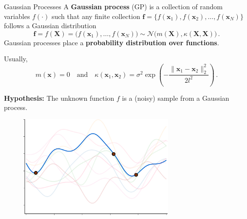 
    \begin{frame}{Gaussian Processes}
        A \textbf{\alert{Gaussian process}} (GP) is a collection of random variables \( f(\cdot) \) such that any finite collection \( \mathbf f = \{f(\mathbf x_1), f(\mathbf x_2), \dots, f(\mathbf x_N) \} \) follows a Gaussian distribution
        \[
            \mathbf f = f(\mathbf X) = \Big(f(\mathbf x_1),\dots,f(\mathbf x_N)\Big) \sim \mathcal{N}\Big(m(\mathbf X), \kappa(\mathbf X, \mathbf X)\Big)\,.
        \]
        Gaussian processes place a \textbf{probability distribution over functions}.

        Usually, 
        \[
            m(\mathbf x) = 0\quad \text{and} \quad            \kappa(\mathbf x_1, \mathbf x_2) = \sigma^2 \exp \left(- \frac{\|\mathbf x_1 - \mathbf x_2 \|_2^2}{2l^2} \right)\,.
        \]

    \end{frame}
    \begin{frame}

        \textbf{Hypothesis: } The unknown function \(f\) is a (noisy) sample from a Gaussian process.

        \begin{figure}
            \centering
            \includegraphics[width=0.7\textwidth]{imgs/GP_hypothesis.pdf}
        \end{figure}
    \end{frame}


